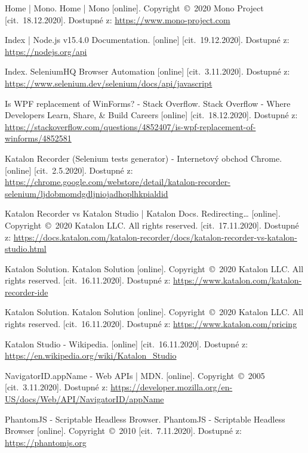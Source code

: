 \begin{thebibliography}{99}
 Home | Mono. Home | Mono [online]. Copyright~©~2020 Mono Project [cit.~18.12.2020]. Dostupné z: \url{https://www.mono-project.com}

 Index | Node.js v15.4.0 Documentation. [online] [cit.~19.12.2020]. Dostupné z: \url{https://nodejs.org/api}

 Index. SeleniumHQ Browser Automation [online] [cit.~3.11.2020]. Dostupné z: \url{https://www.selenium.dev/selenium/docs/api/javascript}

 Is WPF replacement of WinForms? - Stack Overflow. Stack Overflow - Where Developers Learn, Share, \& Build Careers [online] [cit.~18.12.2020]. Dostupné z: \url{https://stackoverflow.com/questions/4852407/is-wpf-replacement-of-winforms/4852581}

 Katalon Recorder (Selenium tests generator) - Internetový obchod Chrome. [online] [cit.~2.5.2020]. Dostupné z: \url{https://chrome.google.com/webstore/detail/katalon-recorder-selenium/ljdobmomdgdljniojadhoplhkpialdid}

 Katalon Recorder vs Katalon Studio | Katalon Docs. Redirecting… [online]. Copyright~©~2020 Katalon LLC. All rights reserved. [cit.~17.11.2020]. Dostupné z: \url{https://docs.katalon.com/katalon-recorder/docs/katalon-recorder-vs-katalon-studio.html}

 Katalon Solution. Katalon Solution [online]. Copyright~©~2020 Katalon LLC. All rights reserved. [cit.~16.11.2020]. Dostupné z: \url{https://www.katalon.com/katalon-recorder-ide}

 Katalon Solution. Katalon Solution [online]. Copyright~©~2020 Katalon LLC. All rights reserved. [cit.~16.11.2020]. Dostupné z: \url{https://www.katalon.com/pricing}

 Katalon Studio - Wikipedia. [online] [cit.~16.11.2020]. Dostupné z: \url{https://en.wikipedia.org/wiki/Katalon_Studio}

 NavigatorID.appName - Web APIs | MDN. [online]. Copyright~©~2005 [cit.~3.11.2020]. Dostupné z: \url{https://developer.mozilla.org/en-US/docs/Web/API/NavigatorID/appName}

 PhantomJS - Scriptable Headless Browser. PhantomJS - Scriptable Headless Browser [online]. Copyright~©~2010 [cit.~7.11.2020]. Dostupné z: \url{https://phantomjs.org}


\end{thebibliography}
